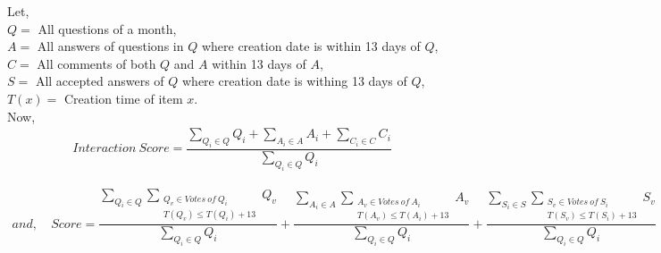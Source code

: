\noindent
Let, \\
$Q = $ {All questions of a month},\\
$A = $ {All answers of questions in $Q$ where creation date is within 13 days of  $Q$},\\ 
$C = $ {All comments of both $Q$ and $A$ within 13 days of $A$},\\
$S = $ {All accepted answers of $Q$ where creation date is withing 13 days of $Q$},\\
$T(x) = $ Creation time of item $x$.\\
Now,\\


\begin{equation}
\begin{split}
Interaction\ Score = \dfrac{\sum_{Q_i\in Q}Q_i+ \sum_{A_i\in A}A_i+\sum_{C_i\in C}C_i}{\sum_{Q_i\in Q}Q_i}
\end{split}
\end{equation}

\begin{equation}
\begin{split}
and,\ & Score = \dfrac{\sum_{Q_i\in Q}\sum_{\substack{Q_v\in Votes\: of\: Q_i\\T(Q_v) \leq T(Q_i)+13}}Q_v}{\sum_{Q_i\in Q}Q_i}+  \dfrac{\sum_{A_i\in A}\sum_{\substack{A_v\in Votes\: of\: A_i\\T(A_v) \leq T(A_i)+13}}A_v}{\sum_{Q_i\in Q}Q_i}+\dfrac{\sum_{S_i\in S}\sum_{\substack{S_v\in Votes\: of\: S_i\\T(S_v) \leq T(S_i)+13}}S_v}{\sum_{Q_i\in Q}Q_i} 
\end{split}
\end{equation}





